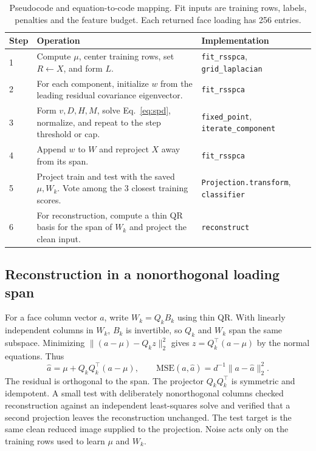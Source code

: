 \begin{table}[H]\small
\caption{Pseudocode and equation-to-code mapping. Fit inputs are training rows, labels, penalties and the feature budget. Each returned face loading has 256 entries.}
\begin{tabularx}{\linewidth}{@{}P{9mm}YP{53mm}@{}}
\toprule
Step & Operation & Implementation \\
 & Compute $\mu$, center training rows, set $R\gets X$, and form $L$. & \texttt{fit\_rsspca}, \texttt{grid\_laplacian} \\
2 & For each component, initialize $w$ from the leading residual covariance eigenvector. & \texttt{fit\_rsspca} \\
3 & Form $v,D,H,M$, solve Eq.~\eqref{eq:spd}, normalize, and repeat to the step threshold or cap. & \texttt{fixed\_point}, \texttt{iterate\_component} \\
4 & Append $w$ to $W$ and reproject $X$ away from its span. & \texttt{fit\_rsspca} \\
5 & Project train and test with the saved $\mu,W_k$. Vote among the 3 closest training scores. & \texttt{Projection.transform}, \texttt{classifier} \\
6 & For reconstruction, compute a thin QR basis for the span of $W_k$ and project the clean input. & \texttt{reconstruct} \\
\bottomrule
\end{tabularx}
\end{table}

\clearpage
\subsection{Reconstruction in a nonorthogonal loading span}

For a face column vector $a$, write $W_k=Q_kB_k$ using thin QR. With linearly independent columns in $W_k$, $B_k$ is invertible, so $Q_k$ and $W_k$ span the same subspace. Minimizing $\|(a-\mu)-Q_k z\|_2^2$ gives $z=Q_k^\top(a-\mu)$ by the normal equations. Thus
\[
\widehat a=\mu+Q_kQ_k^\top(a-\mu),\qquad
\mathrm{MSE}(a,\widehat a)=d^{-1}\|a-\widehat a\|_2^2 .
\]
The residual is orthogonal to the span. The projector $Q_kQ_k^\top$ is symmetric and idempotent. A small test with deliberately nonorthogonal columns checked reconstruction against an independent least-squares solve and verified that a second projection leaves the reconstruction unchanged. The test target is the same clean reduced image supplied to the projection. Noise acts only on the training rows used to learn $\mu$ and $W_k$.

